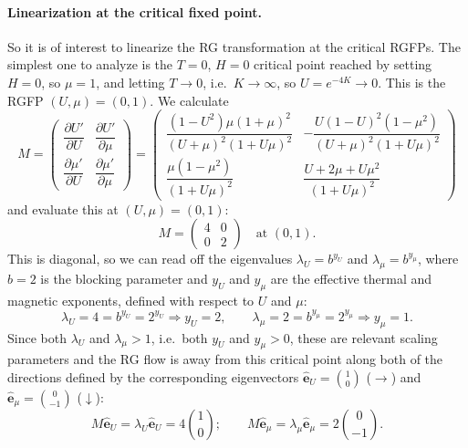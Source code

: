 \paragraph{Linearization at the critical fixed point.}

So it is of interest to linearize the RG transformation at the critical RGFPs. The simplest one to analyze is
the $T = 0$, $H = 0$ critical point reached by setting $H = 0$, so $\mu = 1$, and letting $T\to 0$, i.e.\
$K\to\infty$, so $U = e^{-4K}\to 0$. This is the RGFP $(U,\mu) = (0,1)$. We calculate
\begin{equation}
  M = \begin{pmatrix}\dfrac{\partial U'}{\partial U} & \dfrac{\partial U'}{\partial \mu}\\[6pt] \dfrac{\partial \mu'}{\partial U} & \dfrac{\partial \mu'}{\partial \mu}\end{pmatrix}
    = \begin{pmatrix}
        \dfrac{(1-U^2)\mu(1+\mu)^2}{(U+\mu)^2(1+U\mu)^2} & -\dfrac{U(1-U)^2(1-\mu^2)}{(U+\mu)^2(1+U\mu)^2}\\[12pt]
        \dfrac{\mu(1-\mu^2)}{(1+U\mu)^2} & \dfrac{U+2\mu+U\mu^2}{(1+U\mu)^2}
      \end{pmatrix}
\end{equation}
and evaluate this at $(U,\mu) = (0,1)$:
\begin{equation}
  M = \begin{pmatrix}4 & 0\\ 0 & 2\end{pmatrix}\quad\text{at } (0,1).
\end{equation}
This is diagonal, so we can read off the eigenvalues $\lambda_U = b^{y_U}$ and $\lambda_\mu = b^{y_\mu}$, where
$b = 2$ is the blocking parameter and $y_U$ and $y_\mu$ are the effective thermal and magnetic exponents,
defined with respect to $U$ and $\mu$:
\begin{equation}
  \lambda_U = 4 = b^{y_U} = 2^{y_U}\Rightarrow y_U = 2,\qquad
  \lambda_\mu = 2 = b^{y_\mu} = 2^{y_\mu}\Rightarrow y_\mu = 1 .
\end{equation}
Since both $\lambda_U$ and $\lambda_\mu>1$, i.e.\ both $y_U$ and $y_\mu>0$, these are relevant scaling
parameters and the RG flow is away from this critical point along both of the directions defined by the
corresponding eigenvectors $\hat{\mathbf e}_U = \binom10$ ($\rightarrow$) and $\hat{\mathbf e}_\mu = \binom{0}{-1}$
($\downarrow$):
\begin{equation}
  M\hat{\mathbf e}_U = \lambda_U\hat{\mathbf e}_U = 4\binom10;\qquad
  M\hat{\mathbf e}_\mu = \lambda_\mu\hat{\mathbf e}_\mu = 2\binom{0}{-1}.
\end{equation}

